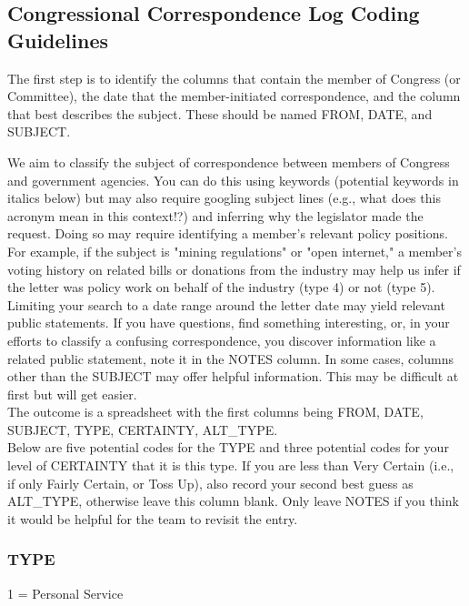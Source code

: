 \documentclass[12pt]{article}
\begin{document}
\subsection{Congressional Correspondence Log Coding Guidelines}

The first step is to identify the columns that contain the member of Congress (or Committee), the date that the member-initiated correspondence, and the column that best describes the subject. These should be named FROM, DATE, and SUBJECT. 

We aim to classify the subject of correspondence between members of Congress and government agencies. You can do this using keywords (potential keywords in italics below) but may also require googling subject lines (e.g., what does this acronym mean in this context!?) and inferring why the legislator made the request. Doing so may require identifying a member's relevant policy positions. For example, if the subject is "mining regulations" or "open internet," a member's voting history on related bills or donations from the industry may help us infer if the letter was policy work on behalf of the industry (type 4) or not (type 5). Limiting your search to a date range around the letter date may yield relevant public statements. If you have questions, find something interesting, or, in your efforts to classify a confusing correspondence, you discover information like a related public statement, note it in the NOTES column. In some cases, columns other than the SUBJECT may offer helpful information. This may be difficult at first but will get easier. \\

The outcome is a spreadsheet with the first columns being FROM, DATE, SUBJECT, TYPE, CERTAINTY, ALT\_TYPE.\\


Below are five potential codes for the TYPE and three potential codes for your level of CERTAINTY that it is this type. If you are less than Very Certain (i.e., if only Fairly Certain, or Toss Up), also record your second best guess as ALT\_TYPE, otherwise leave this column blank. Only leave NOTES if you think it would be helpful for the team to revisit the entry.

\subsubsection{TYPE}

1 = Personal Service\\
\end{document}
